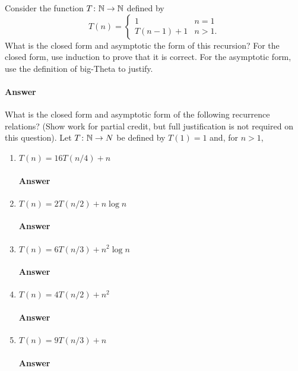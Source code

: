 \documentclass{article}
\begin{document}
\collab{\todo{}}
Consider the function $T \colon {\mathbb N} \to {\mathbb N}$ defined by
$$T(n) = \begin{cases}
            1        & n=1\\
            T(n-1)+1 & n>1.
         \end{cases}
$$
What is the closed form and asymptotic the form of this recursion?  For the
closed form, use induction to prove that it is correct.  For the asymptotic
form, use the definition of big-Theta to justify.

\paragraph{Answer}
\todo{}


\collab{\todo{}}

What is the closed form and asymptotic form of the following recurrence
relations? (Show work for partial credit, but full justification is not required
on this question).
Let $T \colon {\mathbb N} \to N$ be defined by $T(1)=1$ and, for $n>1$,
\begin{enumerate}
    \item $T(n) = 16 T(n/4) + n$
        \paragraph{Answer} \todo{}
    \item $T(n) = 2 T(n/2) + n \log{n}$
        \paragraph{Answer} \todo{}
    \item $T(n) = 6 T(n/3) + n^2 \log{n}$
        \paragraph{Answer} \todo{}
    \item $T(n) = 4 T(n/2) + n^2$
        \paragraph{Answer} \todo{}
    \item $T(n) = 9 T(n/3) + n$
        \paragraph{Answer} \todo{}
\end{enumerate}
\end{document}
